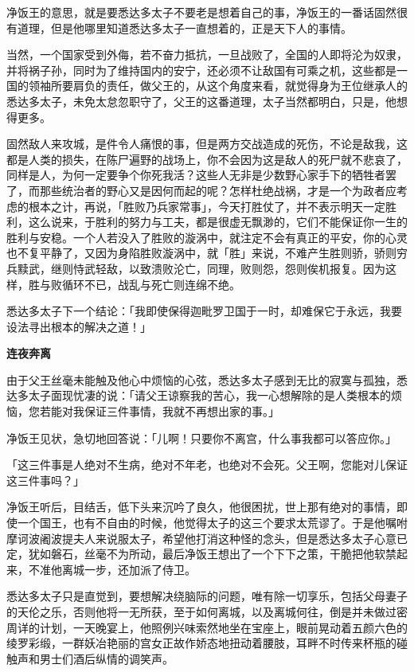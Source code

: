 \documentclass[12pt,twoside,openany]{book}
\newcommand{\mt}[1]{\textbullet \textbf{#1}}
\begin{document}
净饭王的意思，就是要悉达多太子不要老是想着自己的事，净饭王的一番话固然很有道理，但是他哪里知道悉达多太子一直想着的，正是天下人的事情。

当然，一个国家受到外侮，若不奋力抵抗，一旦战败了，全国的人即将沦为奴隶，并将祸子孙，同时为了维持国内的安宁，还必须不让敌国有可乘之机，这些都是一国的领袖所要肩负的责任，做父王的，从这个角度来看，就觉得身为王位继承人的悉达多太子，未免太怠忽职守了，父王的这番道理，太子当然都明白，只是，他想得更多。

固然敌人来攻城，是件令人痛恨的事，但是两方交战造成的死伤，不论是敌我，这都是人类的损失，在陈尸遍野的战场上，你不会因为这是敌人的死尸就不悲哀了，同样是人，为何一定要争个你死我活？这些人无非是少数野心家手下的牺牲者罢了，而那些统治者的野心又是因何而起的呢？怎样杜绝战祸，才是一个为政者应考虑的根本之计，再说，「胜败乃兵家常事」，今天打胜仗了，并不表示明天一定胜利，这么说来，于胜利的努力与工夫，都是很虚无飘渺的，它们不能保证你一生的胜利与安稳。一个人若没入了胜败的漩涡中，就注定不会有真正的平安，你的心灵也不复平静了，又因为身陷胜败漩涡中，就「胜」来说，不难产生胜则骄，骄则穷兵黩武，继则恃武轻敌，以致溃败沦亡，同理，败则怨，怨则俟机报复。因为这样，胜与败循环不已，战乱与死亡则连绵不绝。

悉达多太子下一个结论：「我即使保得迦毗罗卫国于一时，却难保它于永远，我要设法寻出根本的解决之道！」

\mt{连夜奔离}

由于父王丝毫未能触及他心中烦恼的心弦，悉达多太子感到无比的寂寞与孤独，悉达多太子面现忧凄的说：「请父王谅察我的苦心，我一心想解除的是人类根本的烦恼，您若能对我保证三件事情，我就不再想出家的事。」

净饭王见状，急切地回答说：「儿啊！只要你不离宫，什么事我都可以答应你。」

「这三件事是人绝对不生病，绝对不年老，也绝对不会死。父王啊，您能对儿保证这三件事吗？」

净饭王听后，目结舌，低下头来沉吟了良久，他很困扰，世上那有绝对的事情，即使一个国王，也有不自由的时候，他觉得太子的这三个要求太荒谬了。于是他嘱咐摩诃波阇波提夫人来说服太子，希望他打消这种怪的念头，但是悉达多太子心意已定，犹如磐石，丝毫不为所动，最后净饭王想出了一个下下之策，干脆把他软禁起来，不准他离城一步，还加派了侍卫。

悉达多太子只是直觉到，要想解决绕脑际的问题，唯有除一切享乐，包括父母妻子的天伦之乐，否则他将一无所获，至于如何离城，以及离城何往，倒是并未做过密周详的计划，一天晚宴上，他照例兴味索然地坐在宝座上，眼前晃动着五颜六色的绫罗彩缎，一群妖冶艳丽的宫女正故作娇态地扭动着腰肢，耳畔不时传来杯瓶的碰触声和男士们酒后纵情的调笑声。
\end{document}
